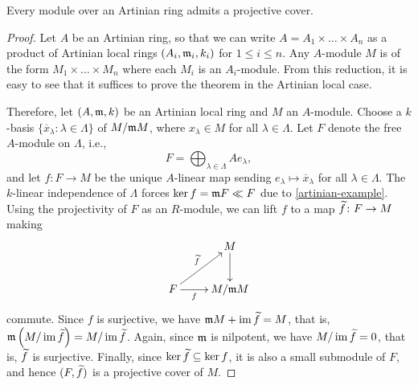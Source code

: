 \begin{theorem}
    Every module over an Artinian ring admits a projective cover.
\end{theorem}
\begin{proof}
    Let $A$ be an Artinian ring, so that we can write $A = A_1\times\dots\times A_n$ as a product of Artinian local rings $(A_i,\mathfrak{m}_i, k_i)$ for $1\le i\le n$. Any $A$-module $M$ is of the form $M_1\times\dots\times M_n$ where each $M_i$ is an $A_i$-module. From this reduction, it is easy to see that it suffices to prove the theorem in the Artinian local case.

    Therefore, let $(A,\mathfrak{m}, k)$ be an Artinian local ring and $M$ an $A$-module. Choose a $k$-basis $\{\overline x_\lambda\colon\lambda\in\Lambda\}$ of $M/\mathfrak{m} M$, where $x_\lambda\in M$ for all $\lambda\in\Lambda$. Let $F$ denote the free $A$-module on $\Lambda$, i.e., 
    \begin{equation*}
        F = \bigoplus_{\lambda\in\Lambda} Ae_\lambda,
    \end{equation*}
    and let $f\colon F\to M$ be the unique $A$-linear map sending $e_\lambda\mapsto\overline x_\lambda$ for all $\lambda\in\Lambda$. The $k$-linear independence of $\Lambda$ forces $\ker f = \mathfrak{m} F\ll F$ due to \ref{artinian-example}. Using the projectivity of $F$ as an $R$-module, we can lift $f$ to a map $\widetilde{f}\colon F\to M$ making 
    \begin{equation*}
        \xymatrix {
            & M\ar[d] \\
            F\ar[ru]^{\wt f}\ar[r]_-f & M/\frakm M
        }
    \end{equation*}
    commute. Since $f$ is surjective, we have $\mathfrak{m} M + \operatorname{im}\widetilde{f} = M$, that is, $\mathfrak{m}\left(M/\operatorname{im}\widetilde{f}\right) = M/\operatorname{im}\widetilde{f}$. Again, since $\mathfrak{m}$ is nilpotent, we have $M/\operatorname{im}\widetilde{f} = 0$, that is, $\widetilde{f}$ is surjective. Finally, since $\ker \widetilde{f}\subseteq\ker f$, it is also a small submodule of $F$, and hence $(F, \widetilde{f})$ is a projective cover of $M$.
\end{proof}

